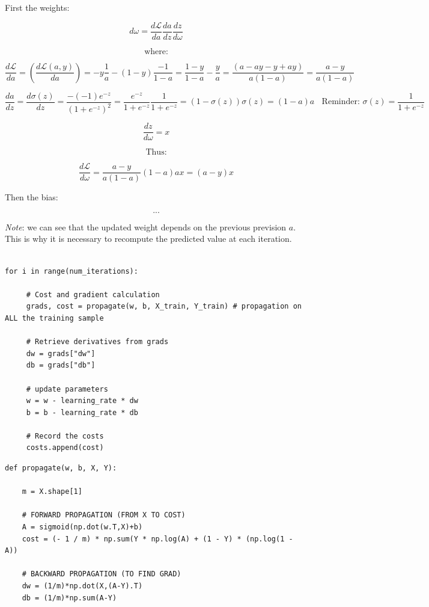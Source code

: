 First the weights:

$$d\omega=\frac{d\mathcal{L}}{da}\frac{da}{dz}\frac{dz}{d\omega}$$

$$\text{where:}$$

$$\frac{d\mathcal{L}}{da} = (\frac{d\mathcal{L}(a,y)}{da}) = -y \frac{1}{a} - (1-y) \frac{-1}{1-a} = \frac{1-y}{1-a} - \frac{y}{a} = \frac{(a-ay-y+ay)}{a(1-a)} = \frac{a-y}{a(1-a)}$$

$$\frac{da}{dz} = \frac{d \sigma(z)}{dz} = \frac{-(-1)e^{-z}}{(1+e^{-z})^2} = \frac{e^{-z}}{1+e^{-z}} \frac{1}{1+e^{-z}}= (1-\sigma(z))\sigma(z) = (1-a)a~~~~\text{Reminder: } \sigma(z) = \frac{1}{1+e^{-z}}$$

$$\frac{dz}{d\omega} = x$$

$$\text{Thus:}$$

$$\frac{d\mathcal{L}}{d\omega} = \frac{a-y}{a(1-a)}(1-a)ax = (a-y)x$$

Then the bias:

$$...$$

\textit{Note}: we can see that the updated weight depends on the previous prevision $a$. This is why it is necessary to recompute the predicted value at each iteration.

\lstset{language=Python}
\lstset{frame=lines}
\lstset{basicstyle=\footnotesize}
\begin{lstlisting}

for i in range(num_iterations):
        
     # Cost and gradient calculation
     grads, cost = propagate(w, b, X_train, Y_train) # propagation on ALL the training sample
        
     # Retrieve derivatives from grads
     dw = grads["dw"]
     db = grads["db"]
        
     # update parameters
     w = w - learning_rate * dw
     b = b - learning_rate * db
        
     # Record the costs
     costs.append(cost)

\end{lstlisting}

\lstset{language=Python}
\lstset{frame=lines}
\lstset{basicstyle=\footnotesize}
\begin{lstlisting}
def propagate(w, b, X, Y):
    
    m = X.shape[1]
    
    # FORWARD PROPAGATION (FROM X TO COST)
    A = sigmoid(np.dot(w.T,X)+b)
    cost = (- 1 / m) * np.sum(Y * np.log(A) + (1 - Y) * (np.log(1 - A))
    
    # BACKWARD PROPAGATION (TO FIND GRAD)
    dw = (1/m)*np.dot(X,(A-Y).T)
    db = (1/m)*np.sum(A-Y)

\end{lstlisting}



\vspace{5mm}